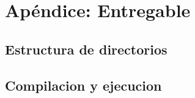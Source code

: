 \section{Ap\'endice: Entregable}
\subsection{Estructura de directorios}

\subsection{Compilacion y ejecucion}
